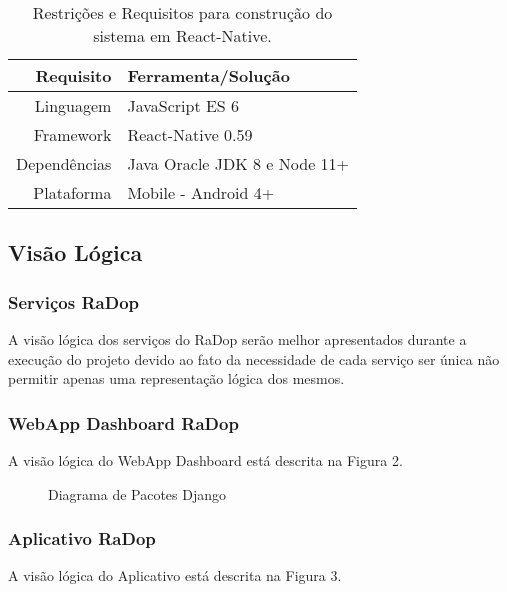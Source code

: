 \begin{table}[ht]
  \begin{tabular}{@{}|r|l|@{}}
  \toprule
  \textbf{Requisito} & \textbf{Ferramenta/Solução}  \\ \midrule
  Linguagem          & JavaScript ES 6              \\ \midrule
  Framework          & React-Native 0.59            \\ \midrule
  Dependências       & Java Oracle JDK 8 e Node 11+ \\ \midrule
  Plataforma         & Mobile - Android 4+          \\ \bottomrule
  \end{tabular}
  \caption{Restrições e Requisitos para construção do sistema em React-Native.}
\end{table}

\subsection{Visão Lógica}\label{visao-logica}

\subsubsection{Serviços RaDop}\label{servicos-radop}

A visão lógica dos serviços do RaDop serão melhor apresentados durante a
execução do projeto devido ao fato da necessidade de cada serviço ser
única não permitir apenas uma representação lógica dos mesmos.

\subsubsection{WebApp Dashboard RaDop}\label{visao-webapp-dashboard-radop}

A visão lógica do WebApp Dashboard está descrita na Figura 2.

\begin{figure}[!htb]
    \caption{\label{fig:diagrama-pact-django} Diagrama de Pacotes Django}
\end{figure}

\subsubsection{Aplicativo RaDop}\label{visao-aplicativo-radop}

A visão lógica do Aplicativo está descrita na Figura 3.

